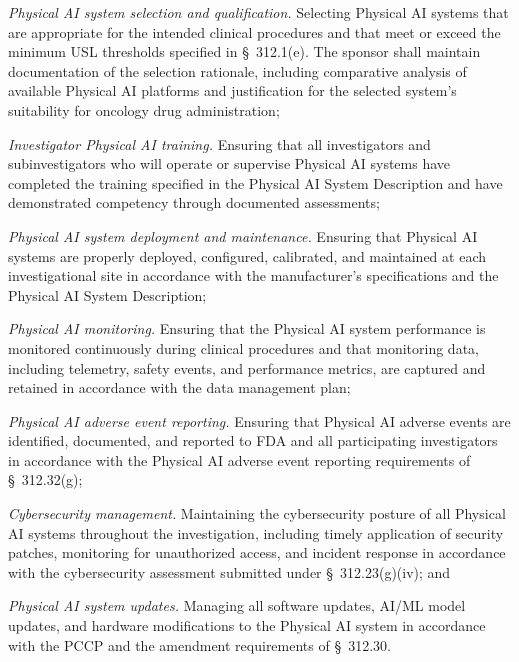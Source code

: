 \begin{description}[leftmargin=0.8cm,style=sameline]
\item[(a)] \textit{Physical AI system selection and qualification.} Selecting Physical AI systems that are appropriate for the intended clinical procedures and that meet or exceed the minimum USL thresholds specified in \S~312.1(e). The sponsor shall maintain documentation of the selection rationale, including comparative analysis of available Physical AI platforms and justification for the selected system's suitability for oncology drug administration;
\item[(b)] \textit{Investigator Physical AI training.} Ensuring that all investigators and subinvestigators who will operate or supervise Physical AI systems have completed the training specified in the Physical AI System Description and have demonstrated competency through documented assessments;
\item[(c)] \textit{Physical AI system deployment and maintenance.} Ensuring that Physical AI systems are properly deployed, configured, calibrated, and maintained at each investigational site in accordance with the manufacturer's specifications and the Physical AI System Description;
\item[(d)] \textit{Physical AI monitoring.} Ensuring that the Physical AI system performance is monitored continuously during clinical procedures and that monitoring data, including telemetry, safety events, and performance metrics, are captured and retained in accordance with the data management plan;
\item[(e)] \textit{Physical AI adverse event reporting.} Ensuring that Physical AI adverse events are identified, documented, and reported to FDA and all participating investigators in accordance with the Physical AI adverse event reporting requirements of \S~312.32(g);
\item[(f)] \textit{Cybersecurity management.} Maintaining the cybersecurity posture of all Physical AI systems throughout the investigation, including timely application of security patches, monitoring for unauthorized access, and incident response in accordance with the cybersecurity assessment submitted under \S~312.23(g)(iv); and
\item[(g)] \textit{Physical AI system updates.} Managing all software updates, AI/ML model updates, and hardware modifications to the Physical AI system in accordance with the PCCP and the amendment requirements of \S~312.30.
\end{description}


